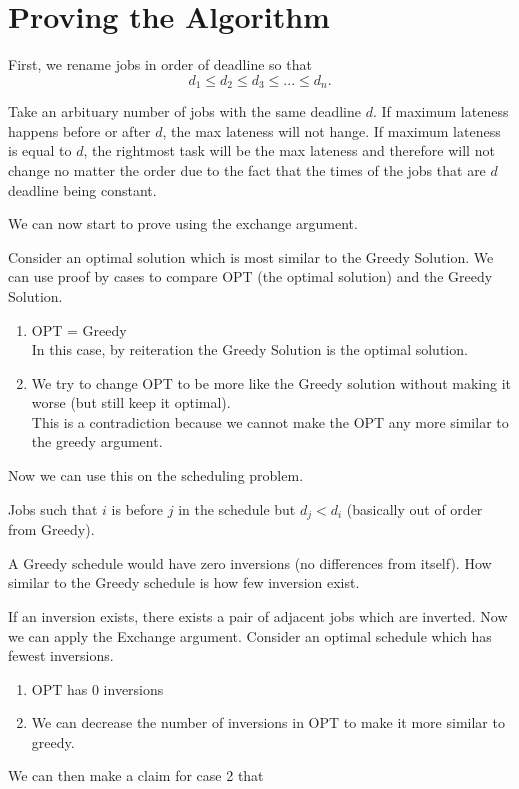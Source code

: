 \documentclass[oneside]{book}
\begin{document}
\section{Proving the Algorithm}

First, we rename jobs in order of deadline so that \[
d_1 \leq d_2 \leq d_3 \leq ... \leq d_n
.\] 

 {
    Take an arbituary number of jobs with the same deadline $d$. If maximum lateness happens before or after $d$, the max lateness will not hange. If maximum lateness is equal to $d$, the rightmost task will be the max lateness and therefore will not change no matter the order due to the fact that the times of the jobs that are $d$ deadline being constant. 
}

We can now start to prove using the exchange argument.

 {
   Consider an optimal solution which is most similar to the Greedy Solution. We can use proof by cases to compare OPT (the optimal solution) and the Greedy Solution.\\
   \begin{enumerate}
       \item OPT = Greedy\\ In this case, by reiteration the Greedy Solution is the optimal solution.
        \item We try to change OPT to be more like the Greedy solution without making it worse (but still keep it optimal).\\ This is a contradiction because we cannot make the OPT any more similar to the greedy argument.
   \end{enumerate}
}

Now we can use this on the scheduling problem.

 {
    Jobs such that $i$ is before $j$ in the schedule but $d_j < d_i$ (basically out of order from Greedy).
}

A Greedy schedule would have zero inversions (no differences from itself). How similar to the Greedy schedule is how few inversion exist.

\lem {} {
   If an inversion exists, there exists a pair of adjacent jobs which are inverted. 
}
Now we can apply the Exchange argument. Consider an optimal schedule which has fewest inversions.
\begin{enumerate}
    \item OPT has 0 inversions
    \item We can decrease the number of inversions in OPT to make it more similar to greedy.
\end{enumerate}
We can then make a claim for case 2 that
\end{document}

